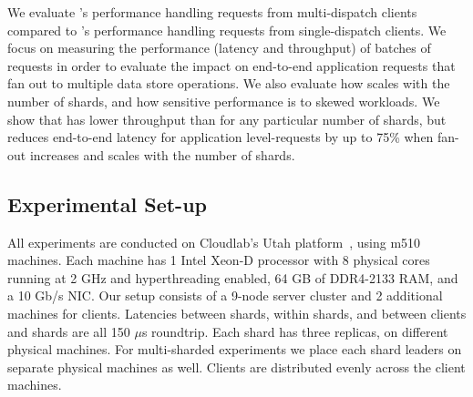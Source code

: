 We evaluate \system's performance handling requests from multi-dispatch clients
compared to \mpaxos's performance handling requests from single-dispatch
clients.  We focus on measuring the performance (latency and throughput) of
batches of requests in order to evaluate the impact on end-to-end application
requests that fan out to multiple data store operations. We also evaluate how
\system scales with the number of shards, and how sensitive performance is to
skewed workloads.
We show that \system{} has lower throughput than \mpaxos for any particular
number of shards, but reduces end-to-end latency for application level-requests
by up to 75\% when fan-out increases and scales with the number of shards.

\subsection{Experimental Set-up}
All experiments are conducted on Cloudlab's Utah platform~\cite{duplyakin2019cloudlab}, using
m510 machines.  Each machine has 1 Intel Xeon-D processor with 8 physical cores
running at 2 GHz and hyperthreading enabled, 64 GB of DDR4-2133 RAM, and a 10
Gb/s NIC\@.  Our setup consists of a 9-node server cluster and 2 additional
machines for clients. Latencies between shards, within shards, and between
clients and shards are all 150 $\mu$s roundtrip.  Each shard has three replicas,
on different physical machines. For multi-sharded experiments we place each
shard leaders on separate physical machines as well. Clients are distributed
evenly across the client machines.

